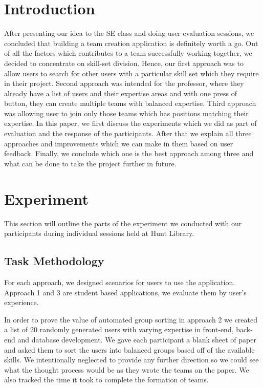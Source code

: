 \documentclass[conference]{IEEEtran}
\begin{document}
\section{Introduction}
After presenting our idea to the SE class and doing user evaluation sessions, we concluded that building a team creation application is definitely worth a go. Out of all the factors which contributes to a team successfully working together, we decided to concentrate on skill-set division. Hence, our first approach was to allow users to search for other users with a particular skill set which they require in their project. Second approach was intended for the professor, where they already have a list of users and their expertise areas and with one press of button, they can create multiple teams with balanced expertise. Third approach was allowing user to join only those teams which has positions matching their expertise.
In this paper, we first discuss the experiments which we did as part of evaluation and the response of the participants. After that we explain all three approaches and improvements which we can make in them based on user feedback. Finally, we conclude which one is the best approach among three and what can be done to take the project further in future.

\section{Experiment}
This section will outline the parts of the experiment we conducted with our participants during individual sessions held at Hunt Library.

\subsection{Task Methodology}
For each approach, we designed scenarios for users to use the application. Approach 1 and 3 are student based applications, we evaluate them by user's experience. 

In order to prove the value of automated group sorting in approach 2 we created a list of 20 randomly generated users with varying expertise in front-end, back-end and database development. We gave each participant a blank sheet of paper and asked them to sort the users into balanced groups based off of the available skills. We intentionally neglected to provide any further direction so we could see what the thought process would be as they wrote the teams on the paper. We also tracked the time it took to complete the formation of teams. 
\end{document}
